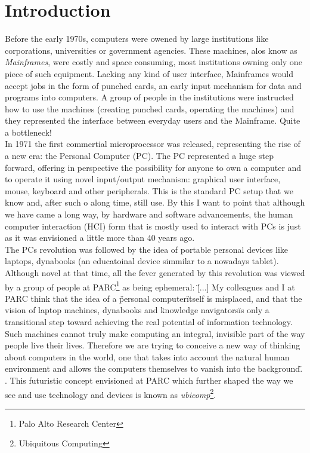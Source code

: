 \chapter{Introduction}\label{ch:introduction}

Before the early 1970s, computers were owened by large institutions like corporations, universities or government agencies. These machines, alos know as \emph{Mainframes}, were costly and space consuming, most institutions owning only one piece of such equipment. Lacking any kind of user interface, Mainframes would accept jobs in the form of punched cards, an early input mechanism for data and programs into computers. A group of people in the institutions were instructed how to use the machines (creating punched cards, operating the machines) and they represented the interface between everyday users and the Mainframe. Quite a bottleneck!\\

In 1971 the first commertial microprocessor was released, representing the rise of a new era: the Personal Computer (PC). The PC represented a huge step forward, offering in perspective the possibility for anyone to own a computer and to operate it using novel input/output mechanism: graphical user interface, mouse, keyboard and other peripherals. This is the standard PC setup that we know and, after such o along time, still use. By this I want to point that although we have came a long way, by hardware and software advancements, the human computer interaction (HCI) form that is mostly used to interact with PCs is just as it was envisioned a little more than 40 years ago.\\

The PCs revolution was followed by the idea of portable personal devices like laptops, dynabooks (an educatoinal device simmilar to a nowadays tablet). Although novel at that time, all the fever generated by this revolution was viewed by a group of people at PARC\footnote{Palo Alto Research Center} as being ephemeral: \"[...] My colleagues and I at PARC think that the idea of a \"personal computer\" itself is misplaced, and that the vision of laptop machines, dynabooks and \"knowledge navigators\" is only a transitional step toward achieving the real potential of information technology. Such machines cannot truly make computing an integral, invisible part of the way people live their lives. Therefore we are trying to conceive a new way of thinking about computers in the world, one that takes into account the natural human environment and allows the computers themselves to vanish into the background\". \cite{weiser1991computer}. This futuristic concept envisioned at PARC which further shaped the way we see and use technology and devices is known as \emph{ubicomp}\footnote{Ubiquitous Computing}.\\









